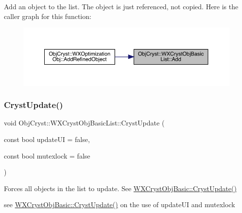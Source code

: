 Add an object to the list. The object is just referenced, not copied. Here is the caller graph for this function\+:
\nopagebreak
\begin{figure}[H]
\begin{center}
\leavevmode
\includegraphics[width=350pt]{class_obj_cryst_1_1_w_x_cryst_obj_basic_list_a6630481e8f5e943935a8b1e8ebb826ea_icgraph}
\end{center}
\end{figure}
\mbox{\label{class_obj_cryst_1_1_w_x_cryst_obj_basic_list_a96cbd9c8341467f21a38964c2838a9c2}} 
\subsubsection{\texorpdfstring{CrystUpdate()}{CrystUpdate()}}
{\footnotesize\ttfamily void Obj\+Cryst\+::\+W\+X\+Cryst\+Obj\+Basic\+List\+::\+Cryst\+Update (\begin{DoxyParamCaption}\item[{const bool}]{update\+UI = {\ttfamily false},  }\item[{const bool}]{mutexlock = {\ttfamily false} }\end{DoxyParamCaption})}

Forces all objects in the list to update. See \mbox{\hyperlink{class_obj_cryst_1_1_w_x_cryst_obj_basic_a7ac00ae2ae28f1a6fa26e6fa571186b6}{W\+X\+Cryst\+Obj\+Basic\+::\+Cryst\+Update()}}

see \mbox{\hyperlink{class_obj_cryst_1_1_w_x_cryst_obj_basic_a7ac00ae2ae28f1a6fa26e6fa571186b6}{W\+X\+Cryst\+Obj\+Basic\+::\+Cryst\+Update()}} on the use of update\+UI and mutexlock

